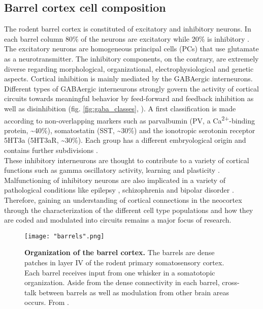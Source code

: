 \subsection{Barrel cortex cell composition} 
The rodent barrel cortex is constituted of excitatory and inhibitory neurons. In each barrel column  80\% of the neurons are excitatory while 20\% is inhibitory \citep{Markram2004}. The excitatory neurons are homogeneous principal cells (PCs) that use glutamate as a neurotransmitter. The inhibitory components, on the contrary, are extremely diverse regarding morphological, organizational, electrophysiological and genetic aspects. Cortical inhibition is mainly mediated by the GABAergic interneurons. Different types of GABAergic interneurons strongly govern the activity of cortical circuits towards meaningful behavior by feed-forward and feedback inhibition as well as disinhibition (fig. \ref{fig:gaba_classes}, \cite{Staiger2015}). A first classification is made according to non-overlapping markers such as parvalbumin (PV, a Ca\textsuperscript{2+}-binding protein, \textasciitilde40\%), somatostatin (SST, \textasciitilde30\%) and the ionotropic serotonin receptor 5HT3a (5HT3aR, \textasciitilde30\%). Each group has a different embryological origin and contains further subdivisions \citep{Staiger2015,Tremblay2017,Rudy2011}. \\
These inhibitory interneurons are thought to contribute to a variety of cortical functions such as gamma oscillatory activity, learning and plasticity \citep{Kuki2015,Fu2015,Li2015}. Malfunctioning of inhibitory neurons are also implicated in a variety of pathological conditions like epilepsy \citep{Cobos2005}, schizophrenia \citep{Rogasch2014} and bipolar disorder \citep{Levinson2007}. Therefore, gaining an understanding of cortical connections in the neocortex through the characterization of the different cell type populations and how they are coded and modulated into circuits remains a major focus of research.
\begin{figure}[!h]
	\captionsetup[figure]{indentation=0pt}
	\texttt{[image: "barrels".png]}
	\caption[Schematic illustration of barrel cortex organization.]{\textbf{Organization of the barrel cortex.} The barrels are dense patches in layer IV of the rodent primary somatosensory cortex. Each barrel receives input from one whisker in a somatotopic organization. Aside from the dense connectivity in each barrel, cross-talk between barrels as well as modulation from other brain areas occurs. From \cite{Feldmeyer2013a}.}	
	\label{fig:barrel_cortex}
\end{figure}
